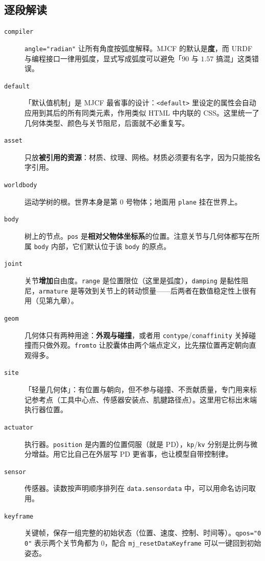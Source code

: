 \subsection{逐段解读}

\begin{description}
	\item[\texttt{compiler}] \texttt{angle="radian"} 让所有角度按弧度解释。MJCF 的默认是\textbf{度}，而 URDF 与编程接口一律用弧度，显式写成弧度可以避免「$90$ 与 $1.57$ 搞混」这类错误。
	\item[\texttt{default}] 「默认值机制」是 MJCF 最省事的设计：\texttt{<default>} 里设定的属性会自动应用到其后的所有同类元素，作用类似 HTML 中内联的 CSS。这里统一了几何体类型、颜色与关节阻尼，后面就不必重复写。
	\item[\texttt{asset}] 只放\textbf{被引用的资源}：材质、纹理、网格。材质必须要有名字，因为只能按名字引用。
	\item[\texttt{worldbody}] 运动学树的根。世界本身是第 0 号物体；地面用 \texttt{plane} 挂在世界上。
	\item[\texttt{body}] 树上的节点。\texttt{pos} 是\textbf{相对父物体坐标系}的位置。注意关节与几何体都写在所属 \texttt{body} 内部，它们默认位于该 \texttt{body} 的原点。
	\item[\texttt{joint}] 关节\textbf{增加}自由度。\texttt{range} 是位置限位（这里是弧度），\texttt{damping} 是黏性阻尼，\texttt{armature} 是等效到关节上的转动惯量——后两者在数值稳定性上很有用（见第九章）。
	\item[\texttt{geom}] 几何体只有两种用途：\textbf{外观与碰撞}，或者用 \texttt{contype}/\texttt{conaffinity} 关掉碰撞而只做外观。\texttt{fromto} 让胶囊体由两个端点定义，比先摆位置再定朝向直观得多。
	\item[\texttt{site}] 「轻量几何体」：有位置与朝向，但不参与碰撞、不贡献质量，专门用来标记参考点（工具中心点、传感器安装点、肌腱路径点）。这里用它标出末端执行器位置。
	\item[\texttt{actuator}] 执行器。\texttt{position} 是内置的位置伺服（就是 PD），\texttt{kp}/\texttt{kv} 分别是比例与微分增益。用它比自己在外层写 PD 更省事，也让模型自带控制律。
	\item[\texttt{sensor}] 传感器。读数按声明顺序排列在 \texttt{data.sensordata} 中，可以用命名访问取用。
	\item[\texttt{keyframe}] 关键帧，保存一组完整的初始状态（位置、速度、控制、时间等）。\texttt{qpos="0 0"} 表示两个关节角都为 $0$，配合 \texttt{mj\_resetDataKeyframe} 可以一键回到初始姿态。
\end{description}

